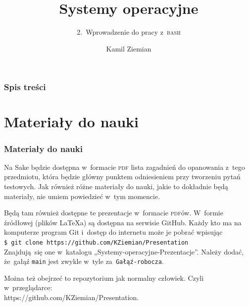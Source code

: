 \documentclass[10pt,t]{beamer}
\title{Systemy operacyjne}
\subtitle{2.~Wprowadzenie do pracy z~\textsc{bash}}
\author{Kamil Ziemian \\
  \email}
\begin{document}





\RaggedRight





\maketitle





\begin{frame}
  \frametitle{Spis treści}


  \tableofcontents

\end{frame}










\section{Materiały do nauki}


\begin{frame}
  \frametitle{Materiały do nauki}


  Na Sake będzie dostępna w~formacie \textsc{pdf} \alert{lista zagadnień do
    opanowania z~tego przedmiotu}, która będzie główny punktem odniesieniem
  przy tworzeniu pytań testowych. Jak również różne materiały do nauki,
  jakie to dokładnie będą materiały, nie umiem powiedzieć w~tym momencie.

  Będą tam również dostępne te prezentacje w~formacie \textsc{pdf}ów.
  W~formie źródłowej (plików \LaTeX a) są dostępna na serwisie GitHub.
  Każdy kto ma na komputerze program Git i~dostęp do internetu może je
  pobrać wpisując \\
  \texttt{\$ git clone https://github.com/KZiemian/Presentation} \\
  Znajdują~się one w~katalogu „Systemy-operacyjne-Prezentacje”. Należy
  dodać, że~gałąź \texttt{main} jest zwykle w~tyle
  za~\texttt{Gałąź-robocza}.

  Można też obejrzeć to repozytorium jak normalny człowiek. Czyli
  w~przeglądarce: \\
  {https://github.com/KZiemian/Presentation}.

\end{frame}
\end{document}
